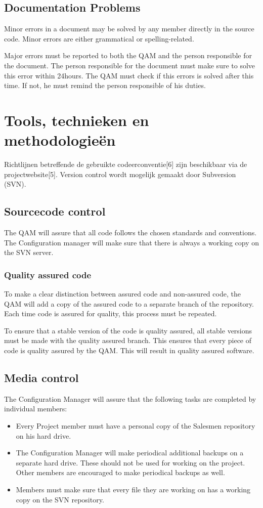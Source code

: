 \documentclass[salesmen, twoside]{softproj}
\begin{document}
\begin{projdoc}
\section{Documentation Problems}
Minor errors in a document may be solved by any member directly in the source code. Minor errors are either grammatical or spelling-related.

Major errors must be reported to both the QAM and the person responsible for the document. The person responsible for the document must make sure to solve this error within 24hours. The QAM must check if this errors is solved after this time. If not, he must remind the person responsible of his duties.

\chapter{Tools, technieken en methodologie\"en}
Richtlijnen betreffende de gebruikte codeerconventie[6] zijn beschikbaar via de projectwebsite[5].  Version control wordt mogelijk gemaakt door Subversion (SVN).

\section{Sourcecode control}
The QAM will assure that all code follows the chosen standards and conventions. The Configuration manager will make sure that there is always a working copy on the SVN server.

\subsection{Quality assured code}
To make a clear distinction between assured code and non-assured code, the QAM will add a copy of the assured code to a separate branch of the repository. Each time code is assured for quality, this process must be repeated.

To ensure that a stable version of the code is quality assured, all stable versions must be made with the quality assured branch. This ensures that every piece of code is quality assured by the QAM. This will result in quality assured software.

\section{Media control}
The Configuration Manager will assure that the following tasks are completed by individual members:
\begin{itemize}
\item
Every Project member must have a personal copy of the Salesmen repository on his hard drive.
\item
The Configuration Manager will make periodical additional backups on a separate hard drive. These should not be used for working on the project. Other members are encouraged to make periodical backups as well.
\item
Members must make sure that every file they are working on has a working copy on the SVN repository.
\end{itemize}


\end{projdoc}
\end{document}
